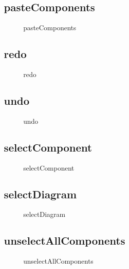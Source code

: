 \documentclass[12pt]{article}
\begin{document}
    \subsection{pasteComponents}
    \begin{figure}[H]
        \centering
        
        \caption{pasteComponents}
    \end{figure}

    \subsection{redo}
    \begin{figure}[H]
        \centering
        
        \caption{redo}
    \end{figure}

    \subsection{undo}
    \begin{figure}[H]
        \centering
        
        \caption{undo}
    \end{figure}


    \subsection{selectComponent}
    \begin{figure}[H]
        \centering
        
        \caption{selectComponent}
    \end{figure}


    \subsection{selectDiagram}
    \begin{figure}[H]
        \centering
        
        \caption{selectDiagram}
    \end{figure}


    \subsection{unselectAllComponents}
    \begin{figure}[H]
        \centering
        
        \caption{unselectAllComponents}
    \end{figure}
\end{document}
